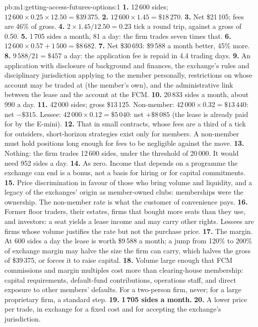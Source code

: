 \begin{solution}{pb:m1:getting-access-futures-options:1}
\textbf{1.} 12\,600 sides; $12\,600 \times 0.25 \times 12.50 = \$39\,375$.
\textbf{2.} $12\,600 \times 1.45 = \$18\,270$.
\textbf{3.} Net \$21\,105; fees are 46\% of gross.
\textbf{4.} $2 \times 1.45/12.50 = 0.23$ tick a round trip, against a gross of
0.50.
\textbf{5.} 1\,705 sides a month, 81 a day: the firm trades seven times that.
\textbf{6.} $12\,600 \times 0.57 + 1\,500 = \$8\,682$.
\textbf{7.} Net \$30\,693: \$9\,588 a month better, 45\% more.
\textbf{8.} $9\,588/21 = \$457$ a day: the application fee is repaid in 4.4
trading days.
\textbf{9.} An application with disclosure of background and finances, the
exchange's rules and disciplinary jurisdiction applying to the member
personally, restrictions on whose account may be traded at  (the
member's own), and the administrative link between the lease and the
account at the FCM.
\textbf{10.} 20\,833 sides a month, about 990 a day.
\textbf{11.} 42\,000 sides; gross \$13\,125. Non-member: $42\,000 \times 0.32 =
\$13\,440$: net $-\$315$. Lessee: $42\,000 \times 0.12 = \$5\,040$: net
$+\$8\,085$ (the lease is already paid for by the E-mini).
\textbf{12.} That in small contracts, whose fees are a third of a tick for
outsiders, short-horizon strategies exist only for members. A non-member
must hold positions long enough for fees to be negligible against the move.
\textbf{13.} Nothing: the firm trades 12\,600 sides, under the threshold of
20\,000. It would need 952 sides a day.
\textbf{14.} As zero. Income that depends on a programme the exchange can end
is a bonus, not a basis for hiring or for capital commitments.
\textbf{15.} Price discrimination in favour of those who bring volume and
liquidity, and a legacy of the exchanges' origin as member-owned clubs:
memberships were the ownership. The non-member rate is what the customer of
convenience pays.
\textbf{16.} Former floor traders, their estates, firms that bought more
seats than they use, and investors: a seat yields a lease income and may
carry other rights. Lessees are firms whose volume justifies the rate but
not the purchase price.
\textbf{17.} The margin. At 600 sides a day the lease is worth \$9\,588 a
month; a jump from 120\% to 200\% of exchange margin may halve the size the
firm can carry, which halves the gross of \$39\,375, or forces it to raise
capital.
\textbf{18.} Volume large enough that FCM commissions and margin multiples
cost more than clearing-house membership: capital requirements, default-fund
contributions, operations staff, and direct exposure to other members'
defaults. For a two-person firm, never; for a large proprietary firm, a
standard step.
\textbf{19.} \textbf{1\,705 sides a month.}
\textbf{20.} A lower price per trade, in exchange for a fixed cost and for
accepting the exchange's jurisdiction.
\end{solution}

